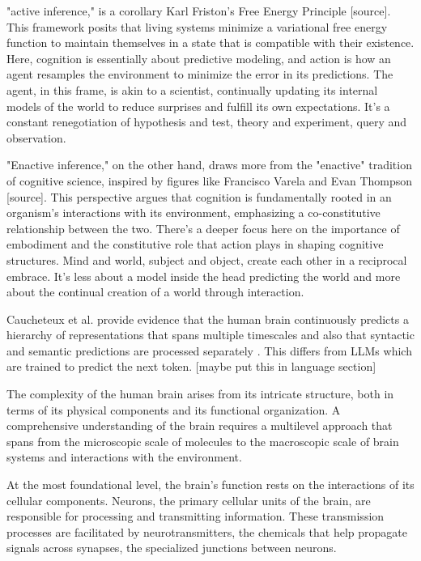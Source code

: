 "active inference," is a corollary Karl Friston's Free Energy Principle [source]. This framework posits that living systems minimize a variational free energy function to maintain themselves in a state that is compatible with their existence. Here, cognition is essentially about predictive modeling, and action is how an agent resamples the environment to minimize the error in its predictions. The agent, in this frame, is akin to a scientist, continually updating its internal models of the world to reduce surprises and fulfill its own expectations. It's a constant renegotiation of hypothesis and test, theory and experiment, query and observation.

"Enactive inference," on the other hand, draws more from the "enactive" tradition of cognitive science, inspired by figures like Francisco Varela and Evan Thompson [source]. This perspective argues that cognition is fundamentally rooted in an organism's interactions with its environment, emphasizing a co-constitutive relationship between the two. There's a deeper focus here on the importance of embodiment and the constitutive role that action plays in shaping cognitive structures. Mind and world, subject and object, create each other in a reciprocal embrace. It's less about a model inside the head predicting the world and more about the continual creation of a world through interaction.


Caucheteux et al. provide evidence that the human brain continuously predicts a hierarchy of representations that spans multiple timescales and also that syntactic and semantic predictions are processed separately \cite{caucheteux_evidence_2023}. This differs from LLMs which are trained to predict the next token. [maybe put this in language section]

The complexity of the human brain arises from its intricate structure, both in terms of its physical components and its functional organization. A comprehensive understanding of the brain requires a multilevel approach that spans from the microscopic scale of molecules to the macroscopic scale of brain systems and interactions with the environment.

At the most foundational level, the brain's function rests on the interactions of its cellular components. Neurons, the primary cellular units of the brain, are responsible for processing and transmitting information. These transmission processes are facilitated by neurotransmitters, the chemicals that help propagate signals across synapses, the specialized junctions between neurons.

